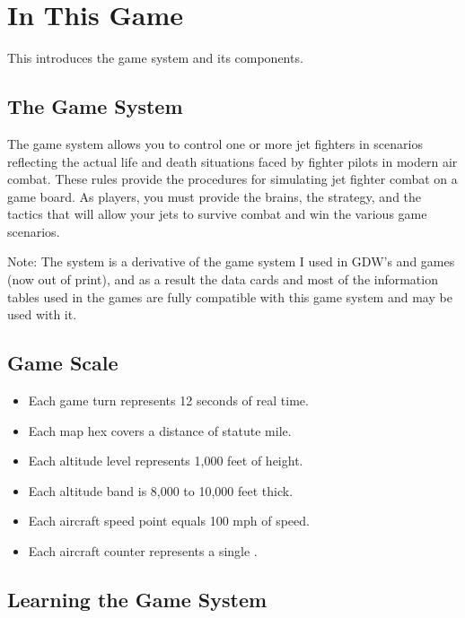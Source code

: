 \section{In This Game}

This {} introduces the {\AirPow} game system and its components.

\subsection{The Game System}

The {\AirPow} game system allows you to control one or more jet fighters in scenarios reflecting the actual life and death situations faced by fighter pilots in modern air combat. These rules provide the procedures for simulating jet fighter combat on a game board. As players, you must provide the brains, the strategy, and the tactics that will allow your jets to survive combat and win the various game scenarios.

Note: The {\AirPow} system is a derivative of the game system I used in GDW's {\AirSup} and {\AirStr} games (now out of print), and as a result the data cards and most of the information tables used in the {\AirSup} games are fully compatible with this game system and may be used with it.

\subsection{Game Scale}

\begin{itemize}
    \item Each game turn represents 12 seconds of real time.
    \item Each map hex covers a distance of {\onethird}  statute mile.
    \item Each altitude level represents 1,000 feet of height.
    \item Each altitude band is 8,000 to 10,000 feet thick.
    \item Each aircraft speed point equals 100 mph of speed.
    \item Each aircraft counter represents a single .
\end{itemize}

\subsection{Learning the Game System}

